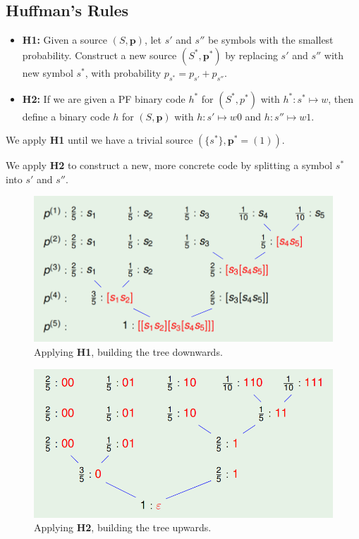 \documentclass[11pt]{article}
\begin{document}
\subsection{Huffman's Rules}
\begin{itemize}
  \item \textbf{H1:}
    Given a source $(S, \textbf{p})$, let $s'$ and $s''$ be symbols with the smallest probability.
    Construct a new source $(S^*, \textbf{p}^*)$ by replacing $s'$ and $s''$ with new symbol $s^*$, with probability $p_{s^*} = p_{s'} + p_{s''}$.
  \item \textbf{H2:}
    If we are given a PF binary code $h^*$ for $(S^*, p^*)$ with $h^* : s^* \mapsto w$, then define a binary code $h$ for $(S, \textbf{p})$ with $h : s' \mapsto w0$ and $h : s'' \mapsto w1$.
\end{itemize}

We apply \textbf{H1} until we have a trivial source $(\{ s^* \}, \textbf{p}^* = (1))$.

We apply \textbf{H2} to construct a new, more concrete code by splitting a symbol $s^*$ into $s'$ and $s''$.

\begin{figure}[h]
  \caption{Applying \textbf{H1}, building the tree downwards.}
  \centering
  \includegraphics[width=\textwidth]{huffman1}
\end{figure}

\begin{figure}[h]
  \caption{Applying \textbf{H2}, building the tree upwards.}
  \centering
  \includegraphics[width=\textwidth]{huffman2}
\end{figure}
\end{document}
